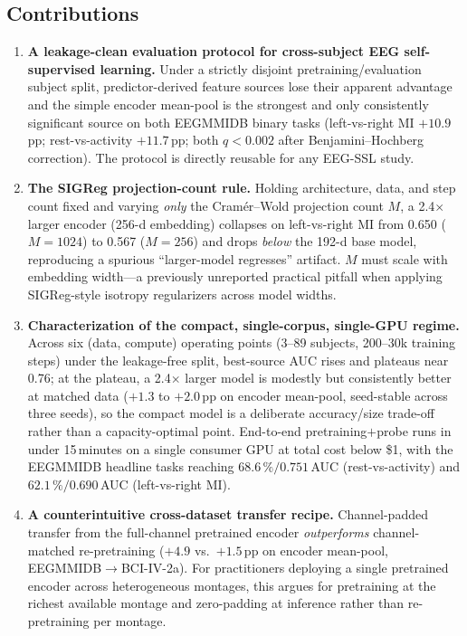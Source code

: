 \subsection*{Contributions}

\begin{enumerate}
\item \textbf{A leakage-clean evaluation protocol for cross-subject EEG
self-supervised learning.} Under a strictly disjoint pretraining/evaluation
subject split, predictor-derived feature sources lose their apparent
advantage and the simple encoder mean-pool is the strongest and only
consistently significant source on both EEGMMIDB binary tasks
(left-vs-right MI $+10.9$\,pp; rest-vs-activity $+11.7$\,pp; both $q<0.002$
after Benjamini--Hochberg correction). The protocol is directly reusable
for any EEG-SSL study.

\item \textbf{The SIGReg projection-count rule.} Holding architecture,
data, and step count fixed and varying \emph{only} the Cram\'er--Wold
projection count $M$, a 2.4$\times$ larger encoder (256-d embedding)
collapses on left-vs-right MI from 0.650 ($M{=}1024$) to 0.567
($M{=}256$) and drops \emph{below} the 192-d base model, reproducing a
spurious ``larger-model regresses'' artifact. $M$ must scale with
embedding width---a previously unreported practical pitfall when applying
SIGReg-style isotropy regularizers across model widths.

\item \textbf{Characterization of the compact, single-corpus, single-GPU
regime.} Across six (data, compute) operating points (3--89 subjects,
200--30k training steps) under the leakage-free split, best-source AUC
rises and plateaus near 0.76; at the plateau, a 2.4$\times$ larger model
is modestly but consistently better at matched data ($+1.3$ to
$+2.0$\,pp on encoder mean-pool, seed-stable across three seeds), so the
compact model is a deliberate accuracy/size trade-off rather than a
capacity-optimal point. End-to-end pretraining$+$probe runs in under
15\,minutes on a single consumer GPU at total cost below \$1, with the
EEGMMIDB headline tasks reaching $68.6\,\%/0.751$\,AUC
(rest-vs-activity) and $62.1\,\%/0.690$\,AUC (left-vs-right MI).

\item \textbf{A counterintuitive cross-dataset transfer recipe.}
Channel-padded transfer from the full-channel pretrained encoder
\emph{outperforms} channel-matched re-pretraining ($+4.9$ vs.\
$+1.5$\,pp on encoder mean-pool, EEGMMIDB$\to$BCI-IV-2a). For
practitioners deploying a single pretrained encoder across heterogeneous
montages, this argues for pretraining at the richest available montage
and zero-padding at inference rather than re-pretraining per montage.


\end{enumerate}
